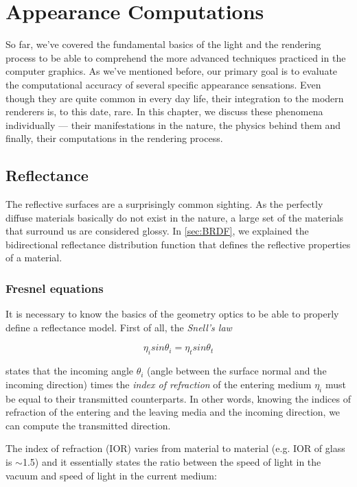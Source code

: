 \chapter{Appearance Computations}
\label{chap:appearance}

So far, we've covered the fundamental basics of the light and the rendering process to be able to comprehend the more advanced techniques practiced in the computer graphics. As we've mentioned before, our primary goal is to evaluate the computational accuracy of several specific appearance sensations. Even though they are quite common in every day life, their integration to the modern renderers is, to this date, rare.  In this chapter, we discuss these phenomena individually --- their manifestations in the nature, the physics behind them and finally, their computations in the rendering process. 

\section{Reflectance}

The reflective surfaces are a surprisingly common sighting. As the perfectly diffuse materials basically do not exist in the nature, a large set of the materials that surround us are considered glossy. In \autoref{sec:BRDF}, we explained the bidirectional reflectance distribution function that defines the reflective properties of a material. 

\subsection{Fresnel equations}

It is necessary to know the basics of the geometry optics to be able to properly define a reflectance model. First of all, the \emph{Snell's law}~\cite{pharr2016physically}

\begin{equation}
\eta_i sin\theta_i = \eta_t sin\theta_t 
\end{equation}

states that the incoming angle $\theta_i$ (angle between the surface normal and the incoming direction) times the \emph{index of refraction} of the entering medium $\eta_i$ must be equal to their transmitted counterparts. In other words, knowing the indices of refraction of the entering and the leaving media and the incoming direction, we can compute the transmitted direction.

The index of refraction (IOR) varies from material to material (e.g. IOR of glass is $\sim$1.5) and it essentially states the ratio between the speed of light in the vacuum and speed of light in the current medium: 

